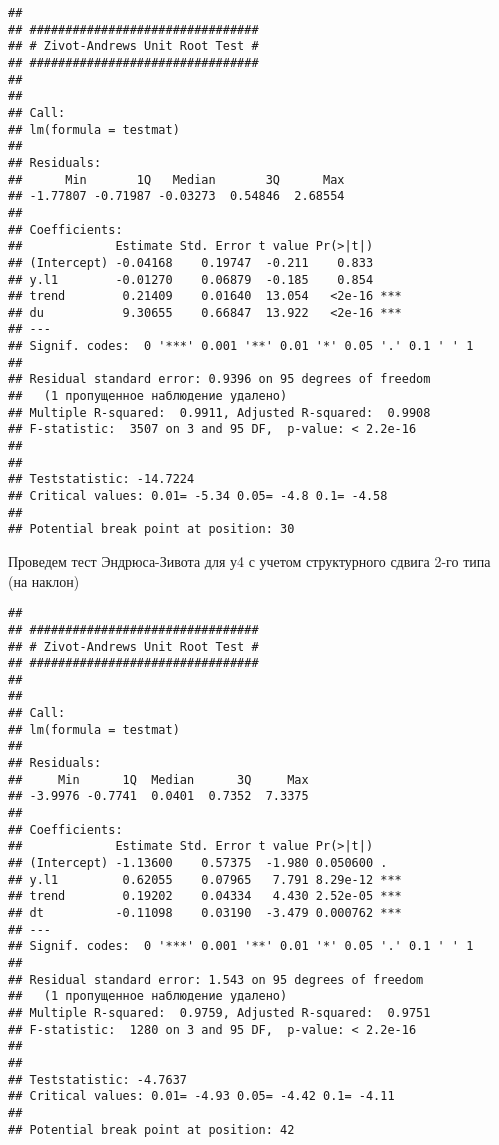 \documentclass[
]{article}
\newenvironment{Shaded}{\begin{snugshade}}{\end{snugshade}}
\newcommand{\AttributeTok}[1]{\textcolor[rgb]{0.13,0.29,0.53}{#1}}
\newcommand{\FunctionTok}[1]{\textcolor[rgb]{0.13,0.29,0.53}{\textbf{#1}}}
\newcommand{\NormalTok}[1]{#1}
\newcommand{\SpecialCharTok}[1]{\textcolor[rgb]{0.81,0.36,0.00}{\textbf{#1}}}
\newcommand{\StringTok}[1]{\textcolor[rgb]{0.31,0.60,0.02}{#1}}
\begin{document}
\begin{verbatim}
## 
## ################################ 
## # Zivot-Andrews Unit Root Test # 
## ################################ 
## 
## 
## Call:
## lm(formula = testmat)
## 
## Residuals:
##      Min       1Q   Median       3Q      Max 
## -1.77807 -0.71987 -0.03273  0.54846  2.68554 
## 
## Coefficients:
##             Estimate Std. Error t value Pr(>|t|)    
## (Intercept) -0.04168    0.19747  -0.211    0.833    
## y.l1        -0.01270    0.06879  -0.185    0.854    
## trend        0.21409    0.01640  13.054   <2e-16 ***
## du           9.30655    0.66847  13.922   <2e-16 ***
## ---
## Signif. codes:  0 '***' 0.001 '**' 0.01 '*' 0.05 '.' 0.1 ' ' 1
## 
## Residual standard error: 0.9396 on 95 degrees of freedom
##   (1 пропущенное наблюдение удалено)
## Multiple R-squared:  0.9911, Adjusted R-squared:  0.9908 
## F-statistic:  3507 on 3 and 95 DF,  p-value: < 2.2e-16
## 
## 
## Teststatistic: -14.7224 
## Critical values: 0.01= -5.34 0.05= -4.8 0.1= -4.58 
## 
## Potential break point at position: 30
\end{verbatim}

Проведем тест Эндрюса-Зивота для у4 с учетом структурного сдвига 2-го
типа (на наклон)

\begin{Shaded}
\end{Shaded}

\begin{verbatim}
## 
## ################################ 
## # Zivot-Andrews Unit Root Test # 
## ################################ 
## 
## 
## Call:
## lm(formula = testmat)
## 
## Residuals:
##     Min      1Q  Median      3Q     Max 
## -3.9976 -0.7741  0.0401  0.7352  7.3375 
## 
## Coefficients:
##             Estimate Std. Error t value Pr(>|t|)    
## (Intercept) -1.13600    0.57375  -1.980 0.050600 .  
## y.l1         0.62055    0.07965   7.791 8.29e-12 ***
## trend        0.19202    0.04334   4.430 2.52e-05 ***
## dt          -0.11098    0.03190  -3.479 0.000762 ***
## ---
## Signif. codes:  0 '***' 0.001 '**' 0.01 '*' 0.05 '.' 0.1 ' ' 1
## 
## Residual standard error: 1.543 on 95 degrees of freedom
##   (1 пропущенное наблюдение удалено)
## Multiple R-squared:  0.9759, Adjusted R-squared:  0.9751 
## F-statistic:  1280 on 3 and 95 DF,  p-value: < 2.2e-16
## 
## 
## Teststatistic: -4.7637 
## Critical values: 0.01= -4.93 0.05= -4.42 0.1= -4.11 
## 
## Potential break point at position: 42
\end{verbatim}
\end{document}
